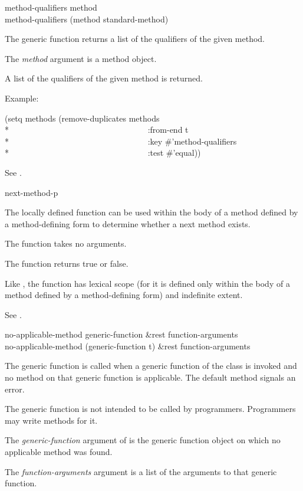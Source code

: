 \begin{defun}
method-qualifiers method \\
method-qualifiers (method standard-method)

The generic function  returns a list of the
qualifiers of the given method.

The \emph{method} argument is a method object. 

A list of the qualifiers of the given method is returned.

Example:
\begin{lisp}
(setq methods (remove-duplicates methods \\*
~~~~~~~~~~~~~~~~~~~~~~~~~~~~~~~~~:from-end t \\*
~~~~~~~~~~~~~~~~~~~~~~~~~~~~~~~~~:key \#'method-qualifiers \\*
~~~~~~~~~~~~~~~~~~~~~~~~~~~~~~~~~:test \#'equal))
\end{lisp}

See .
\end{defun}

\begin{defun}[Function]
next-method-p

The locally defined function  can be used within
the body of a method defined by a method-defining form to determine
whether a next method exists.

The function  takes no arguments.

The function  returns true or false.

Like , the function  has 
lexical scope (for it
is defined only within the body of a method defined by a method-defining form)
and indefinite extent.

See .
\end{defun}

\begin{defun}
no-applicable-method generic-function &rest function-arguments \\
no-applicable-method (generic-function t) &rest function-arguments

The generic function  is called when a
generic function of the class  is invoked
and no method on that generic function is applicable.
The default method signals an error.

The generic function  is not intended to be called
by programmers.  Programmers may write methods for it.

The \emph{generic-function} argument of  is the
generic function object on which no applicable method was found.  

The \emph{function-arguments} argument is a list of the arguments to that
generic function.
\end{defun}

